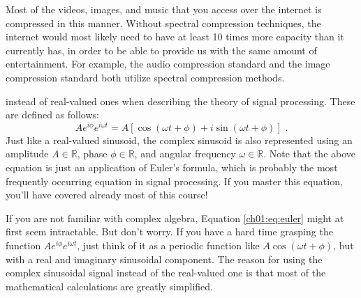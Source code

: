 Most of the videos, images, and music that you access over the
internet is compressed in this manner. Without spectral compression
techniques, the internet would most likely need to have at least 10
times more capacity than it currently has, in order to be able to
provide us with the same amount of entertainment. For example,
the  audio compression standard and
the  image compression standard both utilize spectral
compression methods.


instead of real-valued ones when describing the theory of signal
processing. These are defined as follows:
\begin{equation}
	A e^{i\phi }e^{i\omega t} = A[\cos(\omega t+\phi) + i\sin(\omega
			t+\phi)] \,\,.
	\label{ch01:eq:euler}
\end{equation}
Just like a real-valued sinusoid, the complex sinusoid is also
represented using an amplitude $A \in \mathbb{R}$, phase
$\phi \in \mathbb{R}$, and angular frequency $\omega \in \mathbb{R}$. Note
that the above equation is just an application of Euler's
formula, which is probably the most frequently occurring
equation in signal processing. If you master this equation, you'll
have covered already most of this course!

If you are not familiar with complex algebra,
Equation \ref{ch01:eq:euler} might at first seem intractable. But
don't worry. If you have a hard time grasping the function $A e^{i\phi
		}e^{i\omega t}$, just think of it as a periodic function like
$A\cos(\omega t + \phi)$, but with a real and imaginary sinusoidal
component. The reason for using the complex sinusoidal signal instead
of the real-valued one is that most of the mathematical calculations
are greatly simplified.

